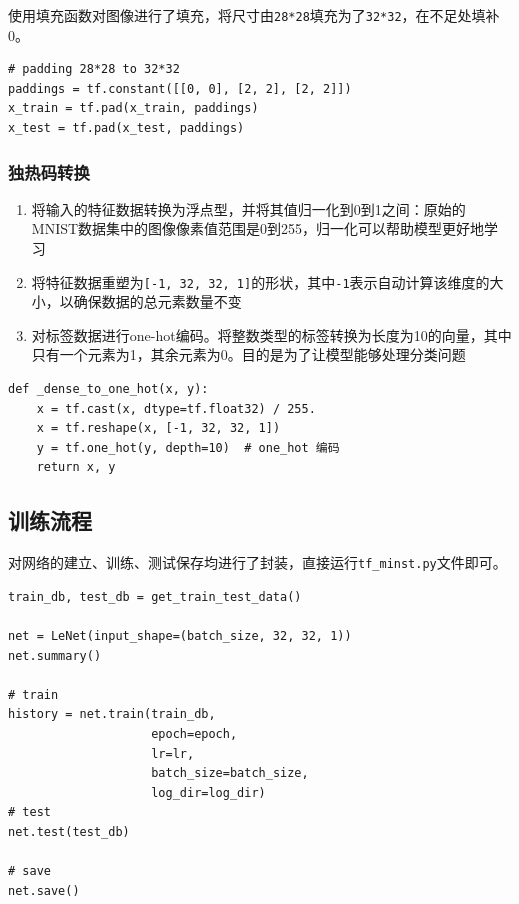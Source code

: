 \documentclass[12pt,a4paper]{article}
\begin{document}
使用填充函数对图像进行了填充，将尺寸由\texttt{28*28}填充为了\texttt{32*32}，在不足处填补0。

\begin{lstlisting}
# padding 28*28 to 32*32
paddings = tf.constant([[0, 0], [2, 2], [2, 2]])
x_train = tf.pad(x_train, paddings)
x_test = tf.pad(x_test, paddings)
\end{lstlisting}

\subsubsection{独热码转换}

\begin{enumerate}
\def\labelenumi{\arabic{enumi}.}
\item
  将输入的特征数据转换为浮点型，并将其值归一化到0到1之间：原始的MNIST数据集中的图像像素值范围是0到255，归一化可以帮助模型更好地学习
\item
  将特征数据重塑为\texttt{{[}-1,\ 32,\ 32,\ 1{]}}的形状，其中\texttt{-1}表示自动计算该维度的大小，以确保数据的总元素数量不变
\item
  对标签数据进行one-hot编码。将整数类型的标签转换为长度为10的向量，其中只有一个元素为1，其余元素为0。目的是为了让模型能够处理分类问题
\end{enumerate}

\begin{lstlisting}
def _dense_to_one_hot(x, y):
    x = tf.cast(x, dtype=tf.float32) / 255.
    x = tf.reshape(x, [-1, 32, 32, 1])
    y = tf.one_hot(y, depth=10)  # one_hot 编码
    return x, y
\end{lstlisting}

\subsection{训练流程}

对网络的建立、训练、测试保存均进行了封装，直接运行\texttt{tf\_minst.py}文件即可。

\begin{lstlisting}
train_db, test_db = get_train_test_data()

net = LeNet(input_shape=(batch_size, 32, 32, 1))
net.summary()

# train
history = net.train(train_db,
                    epoch=epoch,
                    lr=lr,
                    batch_size=batch_size,
                    log_dir=log_dir)
# test
net.test(test_db)

# save
net.save()
\end{lstlisting}
\end{document}

